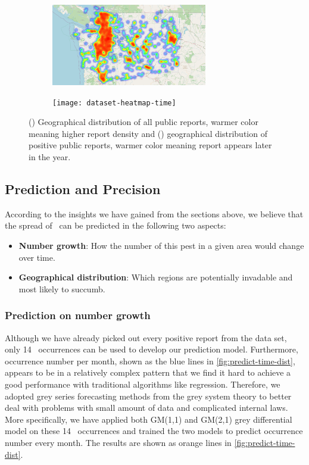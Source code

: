 \documentclass{mcmthesis}
\begin{document}
\begin{figure}[ht]
    \centering
    \begin{subfigure}{6.8cm}
        \centering
        \includegraphics[width=6.8cm]{figures/dataset-heatmap-geo.png}
        \caption{}
        \label{fig:dataset-heatmap-geo}
    \end{subfigure}
    \quad
    \begin{subfigure}{7.37cm}
        \centering
        \texttt{[image: dataset-heatmap-time]}
        \caption{}
        \label{fig:dataset-heatmap-time}
    \end{subfigure}
    \caption{() Geographical distribution of all public reports, warmer color meaning higher report density and () geographical distribution of positive public reports, warmer color meaning report appears later in the year.}
    \label{fig:dataset-heatmap}
\end{figure}

\subsection{Prediction and Precision}
According to the insights we have gained from the sections above, we believe that the spread of \VM\ can be
predicted in the following two aspects:
\begin{itemize}
    \item \textbf{Number growth}: How the number of this pest in a given area would change over time.
    \item \textbf{Geographical distribution}: Which regions are potentially invadable and most likely to succumb.
\end{itemize}

\subsubsection{Prediction on number growth}
Although we have already picked out every positive report from the data set, only 14 \VM\ occurrences can be used to develop our prediction model. Furthermore, occurrence number per month, shown as the blue lines in \autoref{fig:predict-time-dist}, appears to be in a relatively complex pattern that we find it hard to achieve a good performance with traditional algorithms like regression. Therefore, we adopted grey series forecasting methods from the grey system theory to better deal with problems with small amount of data and complicated internal laws\cite{liu2011intro}. More specifically, we have applied both GM(1,1) and GM(2,1) grey differential model on these 14 \VM\ occurrences and trained the two models to predict occurrence number every month. The results are shown as orange lines in \autoref{fig:predict-time-dist}.
\end{document}
